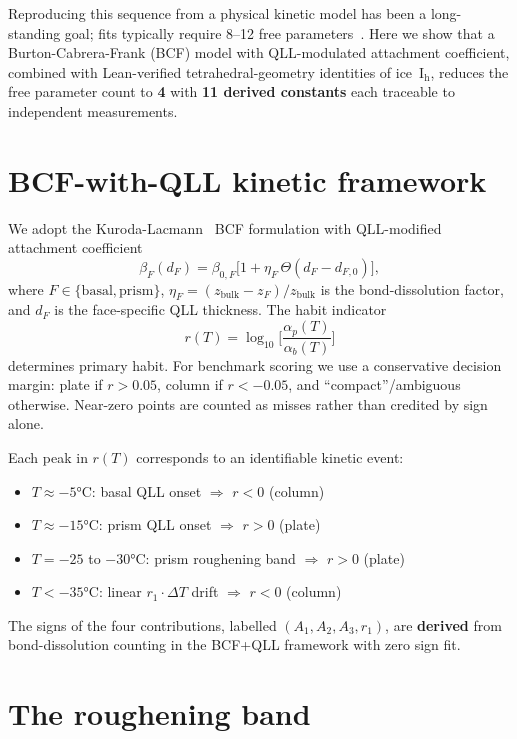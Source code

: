 \documentclass[aps,prb,reprint,superscriptaddress]{revtex4-2}
\begin{document}
Reproducing this sequence from a physical kinetic model has been a
long-standing goal; fits typically require 8--12 free
parameters~\cite{Yokoyama1990,Libbrecht2013}.  Here we show that a
Burton-Cabrera-Frank (BCF) model with QLL-modulated attachment
coefficient, combined with Lean-verified tetrahedral-geometry
identities of ice~I$_\text{h}$, reduces the free parameter count to
\textbf{4} with \textbf{11 derived constants} each traceable to
independent measurements.

\section{BCF-with-QLL kinetic framework}

We adopt the Kuroda-Lacmann~\cite{Kuroda1982} BCF formulation with
QLL-modified attachment coefficient
\begin{equation}
  \beta_F(d_F) = \beta_{0,F} \Big[1 + \eta_F\,\Theta(d_F - d_{F,0})\Big],
\end{equation}
where $F \in \{\text{basal}, \text{prism}\}$, $\eta_F = (z_\text{bulk}
- z_F)/z_\text{bulk}$ is the bond-dissolution factor, and
$d_F$ is the face-specific QLL thickness.  The habit indicator
\begin{equation}\label{eq:r}
  r(T) = \log_{10}\!\bigg[\frac{\alpha_p(T)}{\alpha_b(T)}\bigg]
\end{equation}
determines primary habit.  For benchmark scoring we use a conservative
decision margin: plate if $r > 0.05$, column if $r < -0.05$, and
``compact''/ambiguous otherwise.  Near-zero points are counted as
misses rather than credited by sign alone.

Each peak in $r(T)$ corresponds to an identifiable kinetic event:
\begin{itemize}
\item $T \approx -5$°C: basal QLL onset $\Rightarrow$ $r < 0$ (column)
\item $T \approx -15$°C: prism QLL onset $\Rightarrow$ $r > 0$ (plate)
\item $T = -25$ to $-30$°C: prism roughening band $\Rightarrow$ $r > 0$
    (plate)
\item $T < -35$°C: linear $r_1\cdot\Delta T$ drift $\Rightarrow$ $r < 0$ (column)
\end{itemize}
The signs of the four contributions, labelled $(A_1, A_2, A_3, r_1)$,
are \textbf{derived} from bond-dissolution counting in the
BCF+QLL framework with zero sign fit.

\section{The roughening band}
\end{document}
